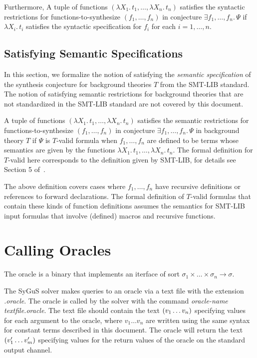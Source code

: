 \documentclass[english,a4paper,10pt]{article}
\begin{document}
Furthermore,
A tuple of functions 
$( \lambda X_1.\, t_1, \ldots, \lambda X_n.\, t_n )$
satisfies the syntactic restrictions
for functions-to-synthesize $( f_1, \ldots, f_n )$
in conjecture $\exists f_1, \ldots, f_n.\,\Psi$
if $\lambda X_i.\, t_i$
satisfies the syntactic specification for $f_i$
for each $i=1,\ldots,n$.

\subsection{Satisfying Semantic Specifications}
\label{ssec:sat-semantic}

In this section,
we formalize the notion of satisfying the \emph{semantic specification}
of the synthesis conjecture
for background theories $T$ from the SMT-LIB standard.
The notion of satisfying semantic restrictions for background theories
that are not standardized in the SMT-LIB standard are not covered by this document.

A tuple of functions 
$( \lambda X_1.\, t_1, \ldots, \lambda X_n.\, t_n)$
satisfies the semantic restrictions
for functions-to-synthesize $( f_1, \ldots, f_n )$
in conjecture $\exists f_1, \ldots, f_n.\,\Psi$ in background theory $T$
if $\Psi$ is $T$-valid formula
when $f_1, \ldots, f_n$ are defined to be terms
whose semantics are given by the functions
$\lambda X_1.\, t_1, \ldots, \lambda X_n.\, t_n$.
The formal definition for $T$-valid here
corresponds to the definition given by SMT-LIB,
for details see Section 5 of~\cite{BarFT-RR-17}.

The above definition covers cases where $f_1, \ldots, f_n$
have recursive definitions or references to forward declarations.
The formal definition of $T$-valid formulas that contain these kinds of
function definitions assumes the semantics for SMT-LIB input formulas that 
involve (defined) macros and recursive functions.


\section{Calling Oracles}
\label{sec:oracleimplementations}

\begin{definition}
The oracle is a binary that implements an iterface of sort $\sigma_1 \times \ldots \times \sigma_n \rightarrow \sigma$.
\end{definition}
The SyGuS solver makes queries to an oracle via a text file with the extension \textit{.oracle}. The oracle is called by the solver with the command \textit{oracle-name textfile.oracle}.
The text file should contain the text ${\tt (}v_1 \ldots v_n{\tt )}$ specifying values for each argument to the oracle, where $v_1 \ldots v_n$ are written using the same syntax for constant terms described in this document. The oracle will return the text ${\tt (}v'_{1} \ldots v'_{m}{\tt )}$ specifying values for the return values of the oracle on the standard output channel.\\
\end{document}
